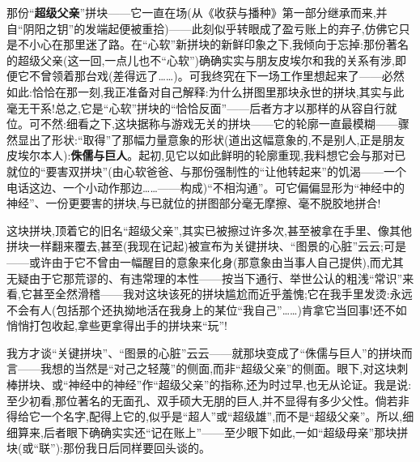 那份“\textbf{超级父亲}”拼块——它一直在场(从《收获与播种》第一部分继承而来,并自“阴阳之钥”的发端起便被重拾)——此刻似乎转眼成了盈亏账上的弃子,仿佛它只是不小心在那里迷了路。在“心软”新拼块的新鲜印象之下,我倾向于忘掉:那份著名的超级父亲(这一回,一点儿也不“心软”)确确实实与朋友皮埃尔和我的关系有涉,即便它不曾领着那台戏(差得远了……)。可我终究在下一场工作里想起来了——必然如此:恰恰在那一刻,我正准备对自己解释:为什么拼图里那块永世的拼块,其实与此毫无干系!总之,它是“心软”拼块的“恰恰反面”——后者方才以那样的从容自行就位。可不然:细看之下,这块据称与游戏无关的拼块——它的轮廓一直最模糊——骤然显出了形状:“取得”了那幅力量意象的形状(道出这幅意象的,不是别人,正是朋友皮埃尔本人):\textbf{侏儒与巨人}。起初,见它以如此鲜明的轮廓重现,我料想它会与那对已就位的“要害双拼块”(由心软爸爸、与那份强制性的“让他转起来”的饥渴——一个电话这边、一个小动作那边……——构成)“不相沟通”。可它偏偏显形为“神经中的神经”、一份更要害的拼块,与已就位的拼图部分毫无摩擦、毫不脱胶地拼合!

这块拼块,顶着它的旧名“超级父亲”,其实已被擦过许多次\dmark{},甚至被拿在手里、像其他拼块一样翻来覆去,甚至(我现在记起)被宣布为关键拼块、“图景的心脏”云云;可是——或许由于它不曾由一幅醒目的意象来化身(那意象由当事人自己提供),而尤其无疑由于它那荒谬的、有违常理的本性——按当下通行、举世公认的粗浅“常识”来看,它甚至全然滑稽——我对这块该死的拼块尴尬而近乎羞愧;它在我手里发烫:永远不会有人(包括那个还执拗地活在我身上的某位“我自己”……)肯拿它当回事!还不如悄悄打包收起,拿些更拿得出手的拼块来“玩”!

我方才谈“关键拼块”、“图景的心脏”云云——就那块变成了“侏儒与巨人”的拼块而言——我想的当然是“对己之轻蔑”的侧面,而非“超级父亲”的侧面。眼下,对这块刺棒拼块、或“神经中的神经”作“超级父亲”的指称,还为时过早,也无从论证。我是说:至少初看,那位著名的无面孔、双手硕大无朋的巨人,并不显得有多少父性。倘若非得给它一个名字,配得上它的,似乎是“超人”或“超级雄”,而不是“超级父亲”。所以,细细算来,后者眼下确确实实还“记在账上”——至少眼下如此,一如“超级母亲”那块拼块(或“联”):那份我日后同样要回头谈的。

